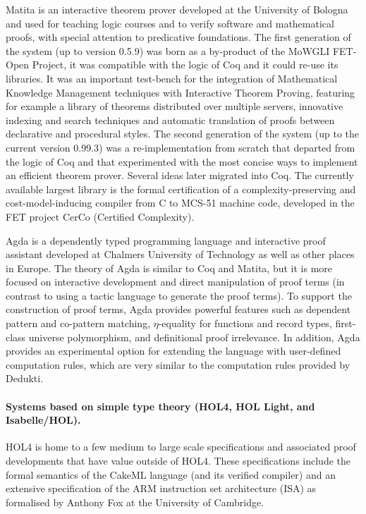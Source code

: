 Matita is an interactive theorem prover developed at the University of
Bologna and used for teaching logic courses and to verify software and
mathematical proofs, with special attention to predicative
foundations. The first generation of the system (up to version 0.5.9)
was born as a by-product of the MoWGLI FET-Open Project, it was
compatible with the logic of Coq and it could re-use its libraries. It
was an important test-bench for the integration of Mathematical
Knowledge Management techniques with Interactive Theorem Proving,
featuring for example a library of theorems distributed over multiple
servers, innovative indexing and search techniques and automatic
translation of proofs between declarative and procedural styles. The
second generation of the system (up to the current version 0.99.3) was
a re-implementation from scratch that departed from the logic of Coq
and that experimented with the most concise ways to implement an
efficient theorem prover. Several ideas later migrated into Coq. The
currently available largest library is the formal certification of a
complexity-preserving and cost-model-inducing compiler from C to
MCS-51 machine code, developed in the FET project CerCo (Certified
Complexity).

Agda is a dependently typed programming language and interactive proof
assistant developed at Chalmers University of Technology as well as
other places in Europe. The theory of Agda is similar to Coq and
Matita, but it is more focused on interactive development and direct
manipulation of proof terms (in contrast to using a tactic language to
generate the proof terms). To support the construction of proof terms,
Agda provides powerful features such as dependent pattern and
co-pattern matching, $\eta$-equality for functions and record types,
first-class universe polymorphism, and definitional proof
irrelevance. In addition, Agda provides an experimental option for
extending the language with user-defined computation rules, which are very
similar to the computation rules provided by Dedukti.

\paragraph*{Systems based on simple type theory (HOL4, HOL Light, and Isabelle/HOL).}

HOL4 is home to a few medium to large scale specifications and
associated proof developments that have value outside of HOL4. These
specifications include the formal semantics of the CakeML language
(and its verified compiler) and an extensive specification of the ARM
instruction set architecture (ISA) as formalised by Anthony Fox at the
University of Cambridge.


